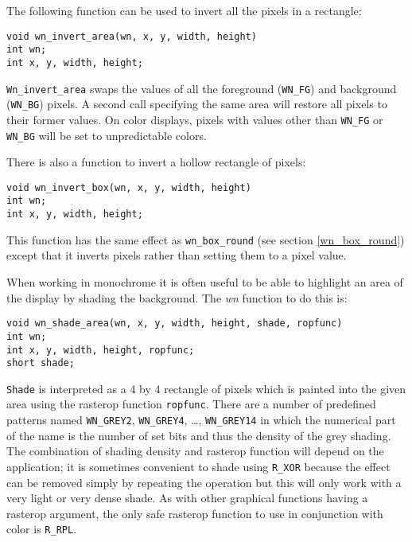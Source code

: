 The following function can be used to invert all the pixels in a rectangle:
\begin{verbatim}
void wn_invert_area(wn, x, y, width, height)
int wn;
int x, y, width, height;
\end{verbatim}
{\tt Wn\_invert\_area} swaps the values of all the
foreground ({\tt WN\_FG}) and background ({\tt WN\_BG}) pixels.
A second call specifying the same area will restore all pixels
to their former values.
On color displays, pixels with values other than {\tt WN\_FG} or {\tt WN\_BG}
will be set to unpredictable colors.

There is also a function to invert a hollow rectangle of pixels:
\begin{verbatim}
void wn_invert_box(wn, x, y, width, height)
int wn;
int x, y, width, height;
\end{verbatim}
This function has the same effect as {\tt wn\_box\_round}
(see section \ref{wn_box_round}) except that
it inverts pixels rather than setting them to a pixel value.

When working in monochrome it is often useful to be able to highlight an area of
the display by shading the background. The {\em wn} function to do this is:
\begin{verbatim}
void wn_shade_area(wn, x, y, width, height, shade, ropfunc)
int wn;
int x, y, width, height, ropfunc;
short shade;
\end{verbatim}
{\tt Shade} is interpreted as a 4 by 4 rectangle of pixels which is painted
into the given area using the rasterop function {\tt ropfunc}.
There are a number of predefined patterns
named {\tt WN\_GREY2}, {\tt WN\_GREY4}, \ldots, {\tt WN\_GREY14} in which the numerical
part of the name is the number of set bits and thus the density of the grey shading.
The combination of shading density and rasterop function will depend on the application;
it is sometimes convenient to shade using {\tt R\_XOR} because the effect can be removed
simply by repeating the operation but this will only work with a very light or very dense shade.
As with other graphical functions having a rasterop argument, the only safe rasterop
function to use in conjunction with color is {\tt R\_RPL}.

